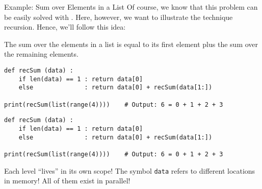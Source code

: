 
\begin{frame}[fragile]{Example: Sum over Elements in a List}
%
Of course, we know that this problem can be easily solved with . Here, however, we want to illustrate the technique recursion. Hence, we'll follow this idea:

\vspace{-4pt}
\begin{tcolorbox}[title=Recursive Approach]
The sum over the elements in a list is equal to its first element plus the sum over the remaining elements.
\end{tcolorbox}
%
\begin{codebox}
\begin{verbatim}
def recSum (data) :
    if len(data) == 1 : return data[0]
    else              : return data[0] + recSum(data[1:])
    
print(recSum(list(range(4))))    # Output: 6 = 0 + 1 + 2 + 3
\end{verbatim}
\vspace{-4pt}
\end{codebox}
%
\end{frame}


\begin{frame}[fragile]
%
\begin{codebox}
\begin{verbatim}
def recSum (data) :
    if len(data) == 1 : return data[0]
    else              : return data[0] + recSum(data[1:])
    
print(recSum(list(range(4))))    # Output: 6 = 0 + 1 + 2 + 3
\end{verbatim}
\end{codebox}
%
\begin{codebox}[Call (line 5) sends to level 0, width=.7\linewidth, nobeforeafter, equal height group = B]
\scriptsize{}
	\begin{codebox}
	\scriptsize{}
		\begin{codebox}
		\scriptsize{}		
		\end{codebox}
	\end{codebox}
\end{codebox}
%
\begin{hintbox}[Regard, width=.29\linewidth, nobeforeafter, equal height group = B]
Each level \enquote{lives} in its own scope! The symbol \texttt{data} refers to different locations in memory! All of them exist in parallel!
\end{hintbox}
%
\end{frame}

